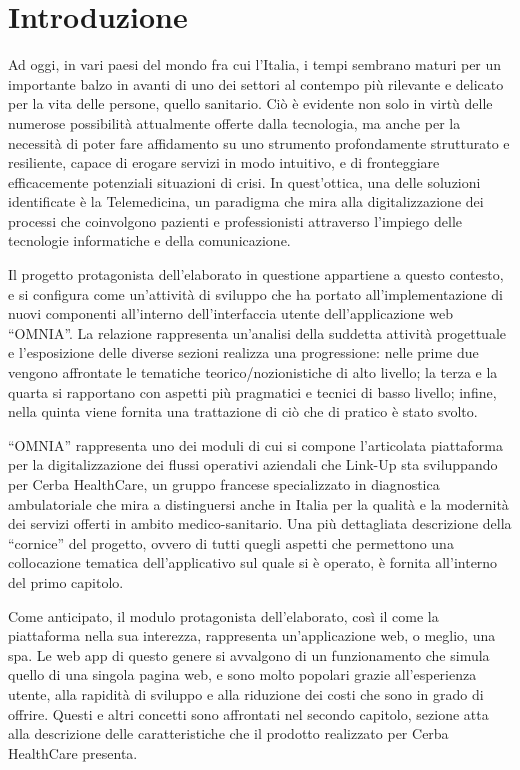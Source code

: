 
\chapter{Introduzione}
Ad oggi, in vari paesi del mondo fra cui l'Italia, i tempi sembrano maturi per un importante balzo in avanti di uno dei settori al contempo più rilevante e delicato per la vita delle persone, quello sanitario. Ciò è evidente non solo in virtù delle numerose possibilità attualmente offerte dalla tecnologia, ma anche per la necessità di poter fare affidamento su uno strumento profondamente strutturato e resiliente, capace di erogare servizi in modo intuitivo, e di fronteggiare efficacemente potenziali situazioni di crisi. In quest'ottica, una delle soluzioni identificate è la Telemedicina, un paradigma che mira alla digitalizzazione dei processi che coinvolgono pazienti e professionisti attraverso l'impiego delle tecnologie informatiche e della comunicazione.

Il progetto protagonista dell'elaborato in questione appartiene a questo contesto, e si configura come un'attività di sviluppo che ha portato all'implementazione di nuovi componenti all'interno dell'interfaccia utente dell'applicazione web “OMNIA”. La relazione rappresenta un'analisi della suddetta attività progettuale e l'esposizione delle diverse sezioni realizza una progressione: nelle prime due vengono affrontate le tematiche teorico/nozionistiche di alto livello; la terza e la quarta si rapportano con aspetti più pragmatici e tecnici di basso livello; infine, nella quinta viene fornita una trattazione di ciò che di pratico è stato svolto.

“OMNIA” rappresenta uno dei moduli di cui si compone l'articolata piattaforma per la digitalizzazione dei flussi operativi aziendali che Link-Up sta sviluppando per Cerba HealthCare, un gruppo francese specializzato in diagnostica ambulatoriale che mira a distinguersi anche in Italia per la qualità e la modernità dei servizi offerti in ambito medico-sanitario. Una più dettagliata descrizione della “cornice” del progetto, ovvero di tutti quegli aspetti che permettono una collocazione tematica dell'applicativo sul quale si è operato, è fornita all'interno del primo capitolo. 

Come anticipato, il modulo protagonista dell'elaborato, così il come la piattaforma nella sua interezza, rappresenta un'applicazione web, o meglio, una \acrlong*{spa}. Le web app di questo genere si avvalgono di un funzionamento che simula quello di una singola pagina web, e sono molto popolari grazie all'esperienza utente, alla rapidità di sviluppo e alla riduzione dei costi che sono in grado di offrire. Questi e altri concetti sono affrontati nel secondo capitolo, sezione atta alla descrizione delle caratteristiche che il prodotto realizzato per Cerba HealthCare presenta.

